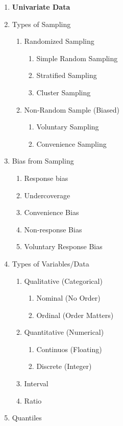 \documentclass[11pt]{article}
\begin{document}
	\begin{enumerate}
		\item \textbf{Univariate Data}
		\item Types of Sampling
		\begin{enumerate}
			\item Randomized Sampling
			\begin{enumerate}
				\item Simple Random Sampling
				\item Stratified Sampling 
				\item Cluster Sampling
			\end{enumerate}
			\item Non-Random Sample (Biased)
			\begin{enumerate}
				\item Voluntary Sampling
				\item Convenience Sampling
			\end{enumerate}
		\end{enumerate}
		\item Bias from Sampling
		\begin{enumerate}
			\item Response bias
			\item Undercoverage
			\item Convenience Bias
			\item  Non-response Bias
			\item Voluntary Response Bias
		\end{enumerate}
		\item Types of Variables/Data
		\begin{enumerate}
			\item Qualitative (Categorical)
			\begin{enumerate}
				\item Nominal (No Order)
				\item Ordinal (Order Matters)
			\end{enumerate}
			\item Quantitative (Numerical)
			\begin{enumerate}
				\item Continuos (Floating)
				\item Discrete (Integer)
			\end{enumerate}
			\item Interval
			\item Ratio
		\end{enumerate}
		\item Quantiles\\

\end{enumerate}
\end{document}
